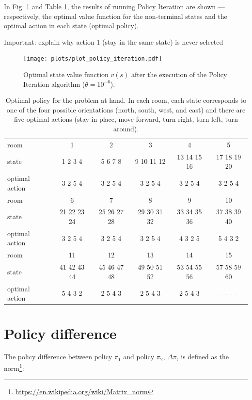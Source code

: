 \documentclass[a4paper]{article}
\begin{document}
In Fig. \ref{fig:policy_iteration} and Table \ref{tab:optimal_policy}, the results of running Policy Iteration are shown --- respectively, the optimal value function for the non-terminal states and the optimal action in each state (optimal policy).

Important: explain why action 1 (stay in the same state) is never selected

\begin{figure}[htbp]
\centering
\texttt{[image: plots/plot\_policy\_iteration.pdf]}
\caption{Optimal state value function $v(s)$ after the execution of the Policy Iteration algorithm ($\theta=10^{-6}$).}
\label{fig:policy_iteration}
\end{figure}

\begin{table}[htbp]
\centering
\begin{tabular}{| p{1cm} | c c c c c |} 
 \hline
 room & 1 & 2 & 3 & 4 & 5 \\ %
 state & 1 2 3 4 & 5 6 7 8 & 9 10 11 12 & 13 14 15 16 & 17 18 19 20 \\
 \hline
 optimal action & 3 2 5 4 & 3 2 5 4 & 3 2 5 4 & 3 2 5 4 & 3 2 5 4 \\ 
 \hline\hline
 room & 6 & 7 & 8 & 9 & 10 \\ %
 state & 21 22 23 24 & 25 26 27 28 & 29 30 31 32 & 33 34 35 36 & 37 38 39 40 \\ %
 \hline
 optimal action & 3 2 5 4 & 3 2 5 4 & 3 2 5 4 & 4 3 2 5 & 5 4 3 2 \\ [1ex]
 \hline\hline
 room & 11 & 12 & 13 & 14 & 15\\ %
 state & 41 42 43 44 & 45 46 47 48 & 49 50 51 52 & 53 54 55 56 & 57 58 59 60\\ %
 \hline
 optimal action & 5 4 3 2 & 2 5 4 3 & 2 5 4 3 & 2 5 4 3 & - - - -\\ [1ex]
 \hline
\end{tabular}
\caption{Optimal policy for the problem at hand. In each room, each state corresponds to one of the four possible orientations (north, south, west, and east) and there are five optimal actions (stay in place, move forward, turn right, turn left, turn around).}
\label{tab:optimal_policy}
\end{table}


\vfill
\newpage
\section{Policy difference}
\label{app_sec:policy_difference}
The policy difference between policy $\pi_1$ and policy $\pi_2$, $\Delta \pi$, is defined as the norm\footnote{\url{https://en.wikipedia.org/wiki/Matrix_norm}}:
\end{document}
